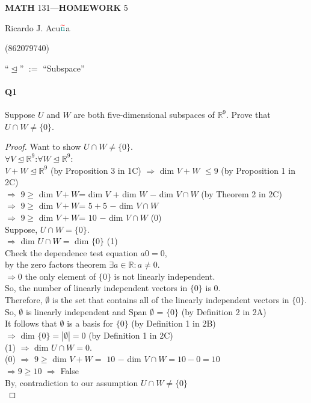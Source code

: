 \documentclass{article}
\begin{document}
\begin{center}
  \textbf{MATH} 131---\textbf{HOMEWORK} 5

  \color{red}R\color{teal}icardo
  \color{red}J\color{cyan}.
  \color{red}A\color{teal}cu$\color{red}{\widetilde{\color{teal}\text{n}}}$\color{teal}a\color{black}

  \color{teal}(\color{red}862079740\color{teal})\color{black}
\end{center}\vspace{1.618em}

``$\trianglelefteq$'' $:=$ ``Subspace''
\paragraph{Q1}  Suppose $U$ and $W$ are both five-dimensional subspaces of $\mathbb{R}^9$.
Prove that $U \cap W  \neq \{0\}$.

\begin{proof} Want to show $U \cap W  \neq \{0\}$.\\
  $\forall V \trianglelefteq \mathbb{R}^9$:\enskip $\forall W \trianglelefteq \mathbb{R}^9$:\\
  $V + W $$\trianglelefteq \mathbb{R}^9$ (by Proposition 3 in 1C)
  $\Rightarrow$  dim $V + W$ $\leq 9$ (by Proposition 1 in 2C)\\
  $\Rightarrow$ $9 \geq$ dim $V + W$= dim $V$ $+$ dim $W$ $-$ dim $V
  \cap W$ (by Theorem 2 in 2C)\\
  $\Rightarrow$ $9 \geq$ dim $V + W$=  $5 + 5$ $-$ dim $V \cap W$\\
  $\Rightarrow$ $9 \geq$ dim $V + W$=  $10$ $-$ dim $V \cap W$ (0) \\
  Suppose, $U \cap W = \{0\}$.\\
  $\Rightarrow$ dim $U \cap W =$ dim $\{0\}$ (1)\\
  Check the dependence test equation $a0 = 0$,\\
  by the zero factors
  theorem $\exists a \in \mathbb{R}: a \neq 0$.\\
  $\Rightarrow 0$ the only element of $\{0\}$ is not linearly
  independent.\\
  So, the number of linearly independent vectors in $\{0\}$
  is $0$.\\
  Therefore, $\emptyset$ is the set that
  contains all of the linearly independent vectors in $\{0\}$.\\
  So, $\emptyset$ is linearly independent and Span $\emptyset$ = $\{0\}$ (by Definition 2 in 2A)\\
  It follows that $\emptyset$ is a basis for $\{0\}$ (by Definition 1
  in 2B)\\
  $\Rightarrow$ dim $\{0\} = |\emptyset| = 0$ (by Definition 1 in 2C)\\
  (1) $\Rightarrow$ dim $U \cap W = 0$.\\
  (0) $\Rightarrow$ $9 \geq$ dim $V + W =$  $10$ $-$ dim $V \cap W$$ =10 -
  0 =10$\\
  $\Rightarrow 9 \geq 10$ $\Rightarrow$ False \\
  By, contradiction to our assumption $U \cap W \neq \{0\}$\\
\end{proof}
\end{document}
